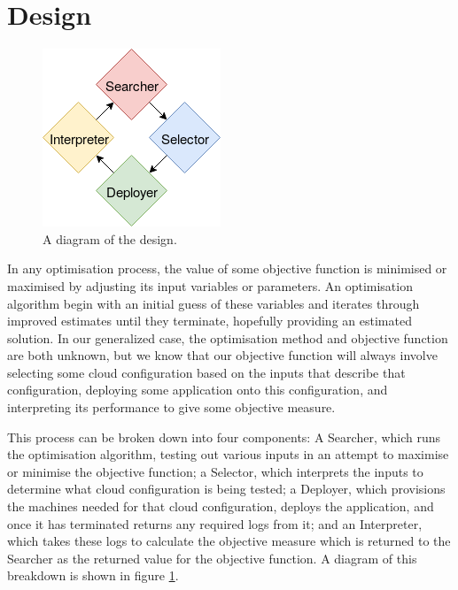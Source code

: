 \documentclass{article}
\begin{document}
\section{Design}
\begin{figure}[!ht]
  \centering
   \includegraphics[scale=0.8]{Design}
  \caption{A diagram of the design.}
  \label{fig:design}
\end{figure}

In any optimisation process, the value of some objective function is minimised or maximised by adjusting its input variables or parameters. An optimisation algorithm begin with an initial guess of these variables and iterates through improved estimates until they terminate, hopefully providing an estimated solution. \cite{Nocedal2006} In our generalized case, the optimisation method and objective function are both unknown, but we know that our objective function will always involve selecting some cloud configuration based on the inputs that describe that configuration, deploying some application onto this configuration, and interpreting its performance to give some objective measure.

This process can be broken down into four components: A Searcher, which runs the optimisation algorithm, testing out various inputs in an attempt to maximise or minimise the objective function; a Selector, which interprets the inputs to determine what cloud configuration is being tested; a Deployer, which provisions the machines needed for that cloud configuration, deploys the application, and once it has terminated returns any required logs from it; and an Interpreter, which takes these logs to calculate the objective measure which is returned to the Searcher as the returned value for the objective function. A diagram of this breakdown is shown in figure \ref{fig:design}.
\end{document}
